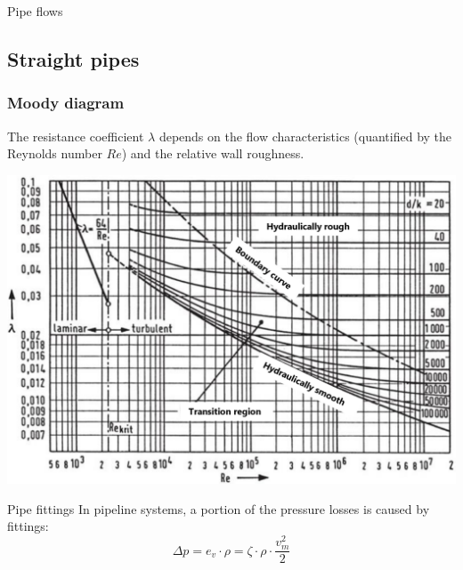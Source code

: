\documentclass{article}
\begin{document}
\begin{multicols}{2}
\begin{theorybox}{Pipe flows}
\end{theorybox}

\vfill
\columnbreak

\subsection{Straight pipes}
\subsubsection{Moody diagram}
The resistance coefficient $\lambda$ depends on the flow characteristics
(quantified by the Reynolds number $Re$) and the relative wall roughness.

\includegraphics[width=\columnwidth]{media/Moody-Diagramm_en.png}

\begin{theorybox}{Pipe fittings}
    In pipeline systems, a portion of the pressure losses is caused by fittings:
    \begin{equation}
        \Delta p = e_v \cdot \rho = \zeta \cdot \rho \cdot \frac{v_m^2}{2}
    \end{equation}


\end{theorybox}
\end{multicols}
\end{document}
